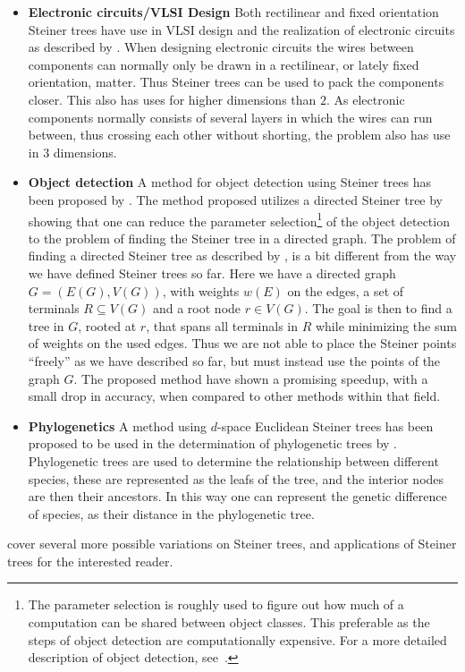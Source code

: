 \begin{itemize}
\item \textbf{Electronic circuits/VLSI Design} \quad Both rectilinear and fixed
  orientation Steiner trees have use in VLSI design and the realization of
  electronic circuits as described by
  \textcite[sec.~2.7,sec~3.6]{brazil2015}. When designing electronic circuits
  the wires between components can normally only be drawn in a rectilinear, or
  lately fixed orientation, matter. Thus Steiner trees can be used to pack the
  components closer. This also has uses for higher dimensions than $2$. As
  electronic components normally consists of several layers in which the wires
  can run between, thus crossing each other without shorting, the problem also
  has use in $3$ dimensions.
\item \textbf{Object detection} \quad A method for object detection using
  Steiner trees has been proposed by \textcite{russakovsky2010}. The method
  proposed utilizes a directed Steiner tree by showing that one can reduce the
  parameter selection\footnote{The parameter selection is roughly used to figure
    out how much of a computation can be shared between object classes. This
    preferable as the steps of object detection are computationally
    expensive. For a more detailed description of object detection,
    see~\cite{russakovsky2010}.} of the object detection to the problem of
  finding the Steiner tree in a directed graph. The problem of finding a
  directed Steiner tree as described by \textcite{russakovsky2010}, is a bit
  different from the way we have defined Steiner trees so far. Here we have a
  directed graph $G = (E(G), V(G))$, with weights $w(E)$ on the edges, a set of
  terminals $R \subseteq V(G)$ and a root node $r \in V(G)$. The goal is then to
  find a tree in $G$, rooted at $r$, that spans all terminals in $R$ while
  minimizing the sum of weights on the used edges. Thus we are not able to place
  the Steiner points ``freely'' as we have described so far, but must instead
  use the points of the graph $G$. The proposed method have shown a promising
  speedup, with a small drop in accuracy, when compared to other methods within
  that field.
\item \textbf{Phylogenetics} \quad A method using $d$-space Euclidean Steiner trees
  has been proposed to be used in the determination of phylogenetic trees by
  \textcite{brazil2009}. Phylogenetic trees are used to determine the
  relationship between different species, these are represented as the leafs of
  the tree, and the interior nodes are then their ancestors. In this way one can
  represent the genetic difference of species, as their distance in the
  phylogenetic tree.
\end{itemize}

\textcite{brazil2015} cover several more possible variations on Steiner trees,
and applications of Steiner trees for the interested reader.

